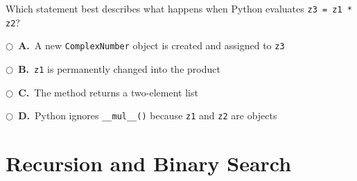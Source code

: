 \documentclass[11pt]{article}
\newcommand{\choice}[2]{%
    \par\noindent
    \(\bigcirc\)\ \textbf{#1.}\ #2
}
\begin{document}
\begin{enumerate}
Which statement best describes what happens when Python evaluates
\texttt{z3 = z1 * z2}?

\choice{A}{A new \texttt{ComplexNumber} object is created and assigned to \texttt{z3}}
\choice{B}{\texttt{z1} is permanently changed into the product}
\choice{C}{The method returns a two-element list}
\choice{D}{Python ignores \texttt{\_\_mul\_\_()} because \texttt{z1} and \texttt{z2} are objects}

\end{enumerate}

\section*{Recursion and Binary Search}
\end{document}
